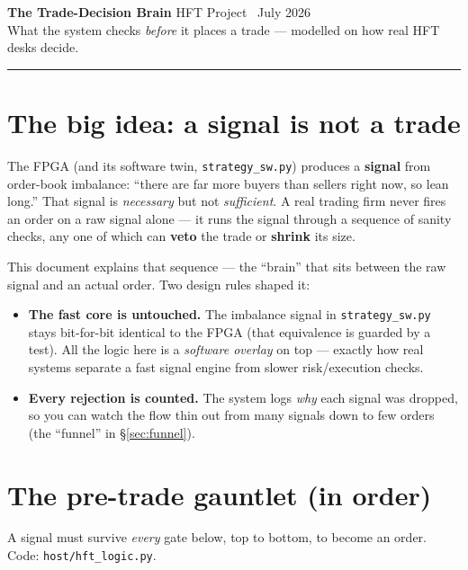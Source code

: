 \documentclass[10pt,a4paper]{article}
\newcommand{\hruleline}{\textcolor{rulegray}{\rule{\linewidth}{1pt}}}
\newcommand{\code}[1]{\texttt{\small #1}}
\begin{document}
{\LARGE\bfseries\color{fpgablue} The Trade-Decision Brain}\hfill
{\small\color{rulegray} HFT Project \textbullet\ July 2026}\\[-1pt]
{\large What the system checks \emph{before} it places a trade --- modelled on how
real HFT desks decide.}

\hruleline

\section{The big idea: a signal is not a trade}

The FPGA (and its software twin, \code{strategy\_sw.py}) produces a \textbf{signal}
from order-book imbalance: ``there are far more buyers than sellers right now,
so lean long.'' That signal is \emph{necessary} but not \emph{sufficient}. A real
trading firm never fires an order on a raw signal alone --- it runs the signal
through a sequence of sanity checks, any one of which can \textbf{veto} the trade
or \textbf{shrink} its size.

This document explains that sequence --- the ``brain'' that sits between the raw
signal and an actual order. Two design rules shaped it:

\begin{itemize}[leftmargin=1.4em, itemsep=1pt]
  \item \textbf{The fast core is untouched.} The imbalance signal in
  \code{strategy\_sw.py} stays bit-for-bit identical to the FPGA (that equivalence
  is guarded by a test). All the logic here is a \emph{software overlay} on top ---
  exactly how real systems separate a fast signal engine from slower risk/execution
  checks.
  \item \textbf{Every rejection is counted.} The system logs \emph{why} each signal
  was dropped, so you can watch the flow thin out from many signals down to few
  orders (the ``funnel'' in \S\ref{sec:funnel}).
\end{itemize}

\section{The pre-trade gauntlet (in order)}

A signal must survive \emph{every} gate below, top to bottom, to become an order.
Code: \code{host/hft\_logic.py}.
\end{document}
